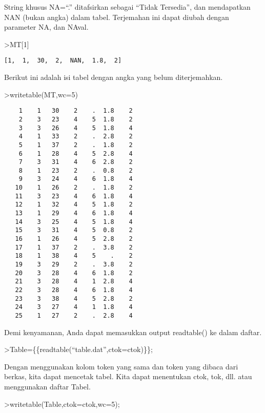 \documentclass[
]{book}
\begin{document}
String khusus NA=``.'' ditafsirkan sebagai ``Tidak Tersedia'', dan mendapatkan NAN (bukan angka) dalam tabel. Terjemahan ini dapat diubah dengan parameter NA, dan NAval.

\textgreater MT{[}1{]}

\begin{verbatim}
[1,  1,  30,  2,  NAN,  1.8,  2]
\end{verbatim}

Berikut ini adalah isi tabel dengan angka yang belum diterjemahkan.

\textgreater writetable(MT,wc=5)

\begin{verbatim}
    1    1   30    2    .  1.8    2
    2    3   23    4    5  1.8    2
    3    3   26    4    5  1.8    4
    4    1   33    2    .  2.8    2
    5    1   37    2    .  1.8    2
    6    1   28    4    5  2.8    4
    7    3   31    4    6  2.8    2
    8    1   23    2    .  0.8    2
    9    3   24    4    6  1.8    4
   10    1   26    2    .  1.8    2
   11    3   23    4    6  1.8    4
   12    1   32    4    5  1.8    2
   13    1   29    4    6  1.8    4
   14    3   25    4    5  1.8    4
   15    3   31    4    5  0.8    2
   16    1   26    4    5  2.8    2
   17    1   37    2    .  3.8    2
   18    1   38    4    5    .    2
   19    3   29    2    .  3.8    2
   20    3   28    4    6  1.8    2
   21    3   28    4    1  2.8    4
   22    3   28    4    6  1.8    4
   23    3   38    4    5  2.8    2
   24    3   27    4    1  1.8    4
   25    1   27    2    .  2.8    4
\end{verbatim}

Demi kenyamanan, Anda dapat memasukkan output readtable() ke dalam daftar.

\textgreater Table=\{\{readtable(``table.dat'',ctok=ctok)\}\};

Dengan menggunakan kolom token yang sama dan token yang dibaca dari berkas, kita dapat mencetak tabel. Kita dapat menentukan ctok, tok, dll. atau menggunakan daftar Tabel.

\textgreater writetable(Table,ctok=ctok,wc=5);
\end{document}
